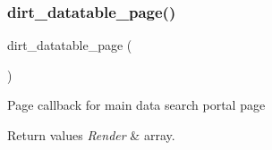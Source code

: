 \subsubsection{\texorpdfstring{dirt\+\_\+datatable\+\_\+page()}{dirt\_datatable\_page()}}
{\footnotesize\ttfamily dirt\+\_\+datatable\+\_\+page (\begin{DoxyParamCaption}{ }\end{DoxyParamCaption})}

Page callback for main data search portal page


\begin{DoxyRetVals}{Return values}
{\em Render} & array. \\
\hline
\end{DoxyRetVals}
